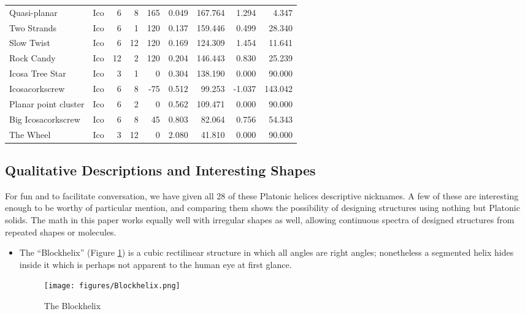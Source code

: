 \documentclass[11pt]{article}
\begin{document}
{\begin{table}[ht]
\begin{tabular}{l l r r r r r r r}
Quasi-planar & Ico &	6 &	8 &	165 &	0.049 &	167.764 & 1.294 & 4.347 \\
Two Strands & Ico &	6 &	1 &	120 &	0.137 &	159.446	& 0.499 & 28.340 \\
Slow Twist & Ico &	6 &	12 &	120 &	0.169 &	124.309	& 1.454	& 11.641 \\
Rock Candy & Ico &	12 &	2 &	120 &	0.204 &	146.443	& 0.830 & 25.239 \\
Icosa Tree Star & Ico &	3 &	1 &	0 &	0.304 &	138.190	& 0.000	& 90.000 \\
Icosacorkscrew & Ico &	6 &	8 &	-75 &	0.512 &	99.253	& -1.037 & 143.042 \\
Planar point cluster & Ico &	6 &	2 &	0 &	0.562 &	109.471 & 0.000 & 90.000 \\
Big Icosacorkscrew  & Ico &	6 &	8 &	45 &	0.803 &	82.064 & 0.756 & 54.343 \\
The Wheel & Ico &	3 &	12 &	0 &	2.080 &	41.810 & 0.000 & 90.000 \\
\hline %
\end{tabular}
\label{table:platonic} %
\end{table}

\subsection{Qualitative Descriptions and Interesting Shapes}

For fun and to facilitate conversation, we have given all
28 of these Platonic helices descriptive nicknames.
A few of these are interesting enough
to be worthy of particular mention, and comparing them
shows the possibility of designing structures using nothing but Platonic solids.
The math in this paper works equally well with irregular shapes as well,
allowing continuous spectra of designed structures from repeated shapes
or molecules.

\begin{itemize}
\item The ``Blockhelix'' (Figure \ref{fig:blockhelix}) is a cubic rectilinear structure in which all angles are right angles; nonetheless
  a segmented helix hides inside it which is perhaps not apparent to the human eye at first glance.
\begin{figure}
     \centering
     \texttt{[image: figures/Blockhelix.png]}
     \caption{The Blockhelix}
  \label{fig:blockhelix}
\end{figure}


\end{itemize}}
\end{document}
